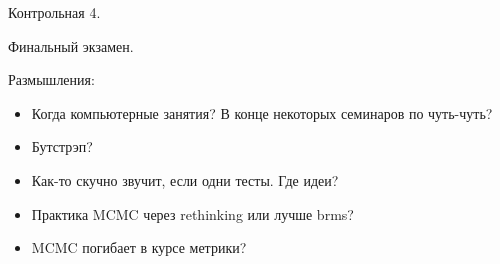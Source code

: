 \documentclass[12pt]{article}
\begin{document}
Контрольная 4.

Финальный экзамен.

Размышления:

\begin{itemize}
  \item Когда компьютерные занятия? В конце некоторых семинаров по чуть-чуть?
  \item Бутстрэп?
  \item Как-то скучно звучит, если одни тесты. Где идеи?
  \item Практика MCMC через rethinking или лучше brms?
  \item MCMC погибает в курсе метрики?
\end{itemize}
\end{document}
